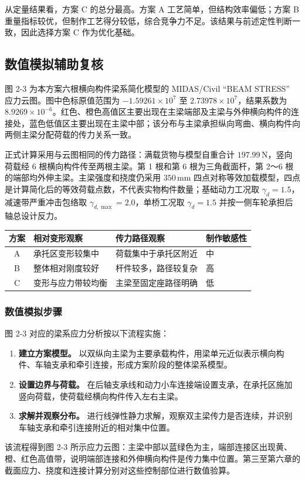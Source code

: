 \documentclass[UTF8,a4paper,12pt,fontset=none]{ctexart}
\renewcommand{\arraystretch}{1.18}
\numberwithin{equation}{section}
\numberwithin{figure}{section}
\numberwithin{table}{section}
\newcommand{\mm}{\,\mathrm{mm}}
\newcommand{\Nunit}{\,\mathrm{N}}
\begin{document}
从定量结果看，方案 C 的总分最高。方案 A 工艺简单，但结构效率偏低；方案 B 重量指标较优，但制作工艺得分较低，综合竞争力不足。该结果与前述定性判断一致，因此选择方案 C 作为优化基础。

\subsection{数值模拟辅助复核}
图 2-3 为本方案六根横向构件梁系简化模型的 MIDAS/Civil ``BEAM STRESS'' 应力云图。图中色标原值范围为 $-1.59261\times10^{7}$ 至 $2.73978\times10^{7}$，结果系数为 $8.9269\times10^{-6}$。红色、橙色高值区主要出现在主梁端部及主梁与外伸横向构件的连接处，蓝色低值区主要出现在主梁中部；该分布与主梁承担纵向弯曲、横向构件向两侧主梁分配荷载的传力关系一致。

正式计算采用与云图相同的传力路径：满载货物与模型自重合计 $197.99\Nunit$，竖向荷载经 6 根横向构件传至两根主梁。第 1 根和第 6 根为三角截面杆，第 2～6 根的端部均外伸主梁。主梁强度和挠度仍采用 $350\mm$ 四点对称等效加载模型，四点是计算简化后的等效荷载点数，不代表实物构件数量；基础动力工况取 $\gamma_d=1.5$，减速带严重冲击包络取 $\gamma_{d,\max}=2.0$，单桥工况取 $\gamma_d=1.5$ 并按一侧车轮承担后轴总设计反力。

\begin{center}
{
\renewcommand{\arraystretch}{1.08}
\begin{tabularx}{0.98\linewidth}{c Y Y Y}
\toprule
\textbf{方案} & \textbf{相对变形观察} & \textbf{传力路径观察} & \textbf{制作敏感性} \\\midrule
A & 承托区变形较集中 & 荷载集中于承托区附近 & 中 \\
B & 整体相对刚度较好 & 杆件较多，路径较复杂 & 高 \\
C & 变形与应力带较均衡 & 主梁至固定座路径明确 & 低 \\
\bottomrule
\end{tabularx}
}
\end{center}

\subsubsection{数值模拟步骤}
图 2-3 对应的梁系应力分析按以下流程实施：
\begin{enumerate}[label=\arabic*.,leftmargin=2.8em]
  \item \textbf{建立方案模型。} 以双纵向主梁为主要承载构件，用梁单元近似表示横向构件、车轴支承和牵引连接，形成方案阶段的整体梁系模型。
  \item \textbf{设置边界与荷载。} 在后轴支承线和动力小车连接端设置支承，在承托区施加竖向荷载，使荷载经横向构件传入左右主梁。
  \item \textbf{求解并观察分布。} 进行线弹性静力求解，观察双主梁传力是否连续，并识别车轴支承和牵引连接附近的相对集中位置。
\end{enumerate}
该流程得到图 2-3 所示应力云图：主梁中部以蓝绿色为主，端部连接区出现黄、橙、红色高值带，说明端部连接和外伸横向构件是传力集中位置。第三至第六章的截面应力、挠度和连接计算分别对这些控制部位进行数值验算。
\end{document}
